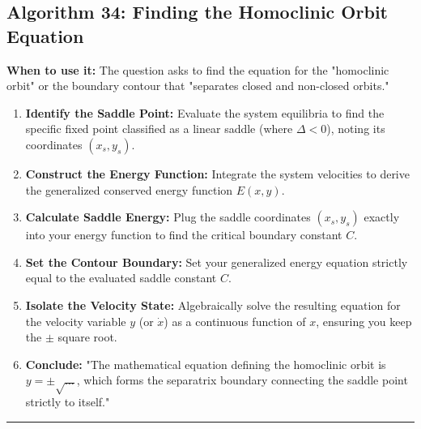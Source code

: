 \documentclass[11pt, a4paper]{report}
\begin{document}
\subsection*{Algorithm 34: Finding the Homoclinic Orbit Equation}
\textbf{When to use it:} The question asks to find the equation for the "homoclinic orbit" or the boundary contour that "separates closed and non-closed orbits."
\begin{enumerate}[label=\textbf{\arabic*.}]
    \item \textbf{Identify the Saddle Point:} Evaluate the system equilibria to find the specific fixed point classified as a linear saddle (where $\Delta < 0$), noting its coordinates $(x_s, y_s)$.
    \item \textbf{Construct the Energy Function:} Integrate the system velocities to derive the generalized conserved energy function $E(x,y)$.
    \item \textbf{Calculate Saddle Energy:} Plug the saddle coordinates $(x_s, y_s)$ exactly into your energy function to find the critical boundary constant $C$.
    \item \textbf{Set the Contour Boundary:} Set your generalized energy equation strictly equal to the evaluated saddle constant $C$.
    \item \textbf{Isolate the Velocity State:} Algebraically solve the resulting equation for the velocity variable $y$ (or $\dot{x}$) as a continuous function of $x$, ensuring you keep the $\pm$ square root.
    \item \textbf{Conclude:} "The mathematical equation defining the homoclinic orbit is $y = \pm \sqrt{\dots}$, which forms the separatrix boundary connecting the saddle point strictly to itself."
\end{enumerate}
\vspace{1em}
\noindent\rule{\textwidth}{0.4pt}
\vspace{1em}
\end{document}
